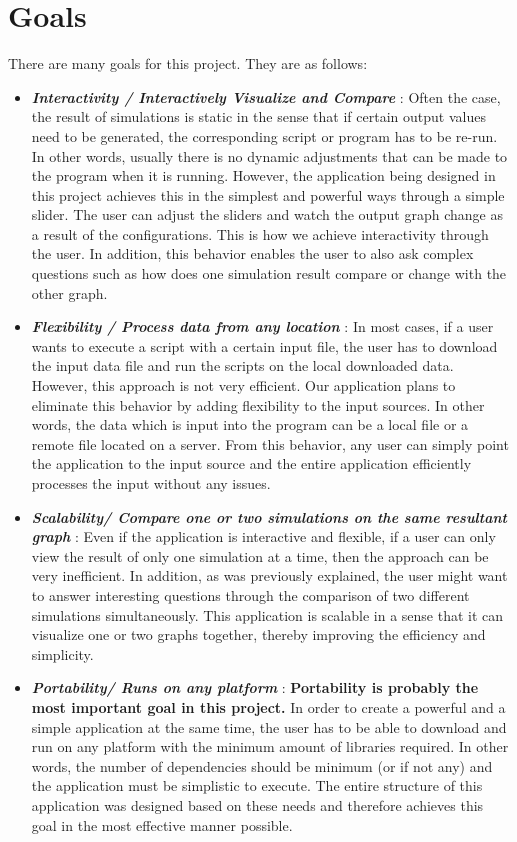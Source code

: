 \section*{Goals}

There are many goals for this project. They are as follows:

\begin{itemize}
    \item \textbf{\textit{Interactivity / Interactively Visualize and Compare} }: Often the case, the result of simulations is static in the sense that if certain output values need to be generated, the corresponding script or program has to be re-run. In other words, usually there is no dynamic adjustments that can be made to the program when it is running. However, the application being designed in this project achieves this in the simplest and powerful ways through a simple slider. The user can adjust the sliders and watch the output graph change as a result of the configurations. This is how we achieve interactivity through the user. In addition, this behavior enables the user to also ask complex questions such as how does one simulation result compare or change with the other graph.
    
    \item \textbf{\textit{Flexibility / Process data from any location} }: In most cases, if a user wants to execute a script with a certain input file, the user has to download the input data file and run the scripts on the local downloaded data. However, this approach is not very efficient. Our application plans to eliminate this behavior by adding flexibility to the input sources. In other words, the data which is input into the program can be a local file or a remote file located on a server. From this behavior, any user can simply point the application to the input source and the entire application efficiently processes the input without any issues. 
    
    \item \textbf{\textit{Scalability/ Compare one or two simulations on the same resultant graph} }: Even if the application is interactive and flexible, if a user can only view the result of only one simulation at a time, then the approach can be very inefficient. In addition, as was previously explained, the user might want to answer interesting questions through the comparison of two different simulations simultaneously. This application is scalable in a sense that it can visualize one or two graphs together, thereby improving the efficiency and simplicity. 
    
    \item \textbf{\textit{Portability/ Runs on any platform} }: \textbf{Portability is probably the most important goal in this project.} In order to create a powerful and a simple application at the same time, the user has to be able to download and run on any platform with the minimum amount of libraries required. In other words, the number of dependencies should be minimum (or if not any) and the application must be simplistic to execute. The entire structure of this application was designed based on these needs and therefore achieves this goal in the most effective manner possible.   
\end{itemize}

